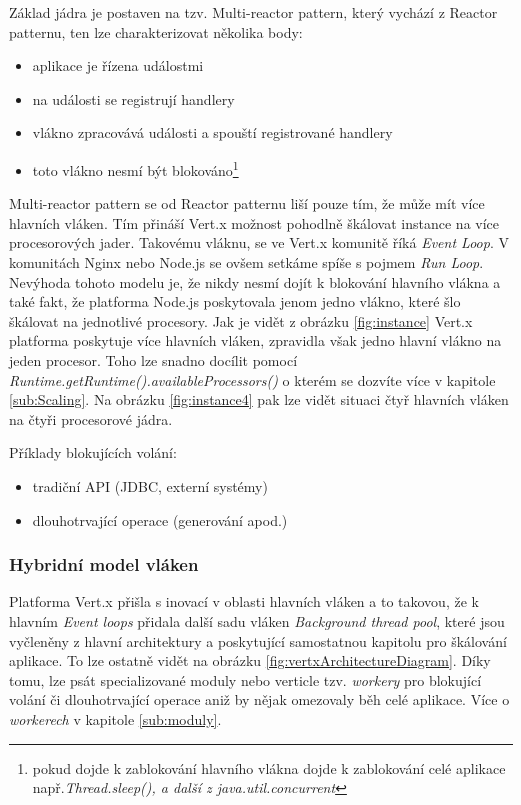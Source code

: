Základ jádra je postaven na tzv. Multi-reactor pattern\cite{eventLoops}, který vychází z Reactor patternu\cite{reactorPattern}, ten lze charakterizovat několika body:

\begin{itemize}
\item{aplikace je řízena událostmi}
\item{na události se registrují handlery}
\item{vlákno zpracovává události a spouští registrované handlery}
\item{toto vlákno nesmí být blokováno\footnote{pokud dojde k zablokování hlavního vlákna dojde k zablokování celé aplikace např.\emph{Thread.sleep(), a další z java.util.concurrent }}}
\end{itemize}

Multi-reactor pattern\cite{eventLoops} se od Reactor patternu liší pouze tím, že může mít více hlavních vláken. Tím přináší Vert.x možnost pohodlně škálovat instance na více procesorových jader. Takovému vláknu, se ve Vert.x komunitě říká \emph{Event Loop}. V komunitách Nginx nebo Node.js se ovšem setkáme spíše s pojmem \emph{Run Loop}. Nevýhoda tohoto modelu je, že nikdy nesmí dojít k blokování hlavního vlákna a také fakt, že platforma Node.js poskytovala jenom jedno vlákno, které šlo škálovat na jednotlivé procesory. Jak je vidět z obrázku \vref{fig:instance} Vert.x platforma poskytuje více hlavních vláken, zpravidla však jedno hlavní vlákno na jeden procesor. Toho lze snadno docílit pomocí \emph{Runtime.getRuntime().availableProcessors()} o kterém se dozvíte více v kapitole \ref{sub:Scaling}. Na obrázku \vref{fig:instance4} pak lze vidět situaci čtyř hlavních vláken na čtyři procesorové jádra.

Příklady blokujících volání:
\begin{itemize}
\item{tradiční API (JDBC, externí systémy)}
\item{dlouhotrvající operace (generování apod.)}
\end{itemize}

\subsubsection{Hybridní model vláken}\label{sub:hybrid}

Platforma Vert.x přišla s inovací v oblasti hlavních vláken a to takovou, že k hlavním \emph{Event loops} přidala další sadu vláken \emph{Background thread pool}, které jsou vyčleněny z hlavní architektury a poskytující samostatnou kapitolu pro škálování aplikace. To lze ostatně vidět na obrázku \vref{fig:vertxArchitectureDiagram}. Díky tomu, lze psát specializované moduly nebo verticle tzv. \emph{workery} pro blokující volání či dlouhotrvající operace aniž by nějak omezovaly běh celé aplikace. Více o \emph{workerech} v kapitole \ref{sub:moduly}.


